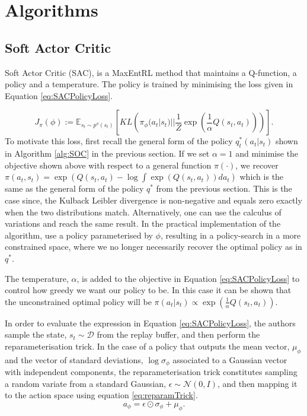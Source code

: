 \documentclass{report}
\numberwithin{equation}{section}
\numberwithin{figure}{section}
\numberwithin{table}{section}
\numberwithin{algorithm}{section}
\begin{document}
\chapter{Algorithms}\label{chap:MaxEntRLAlgos}

\section{Soft Actor Critic}\label{sec:SAC}
Soft Actor Critic (SAC), is a MaxEntRL method that maintains 
a Q-function, a policy and a temperature. The policy 
is trained by minimising the loss given in Equation \ref{eq:SACPolicyLoss}.

\begin{equation}\label{eq:SACPolicyLoss}
  J_\pi(\phi):=\mathbb{E}_{s_t\sim p^\pi(s_t)}\left[KL\left(\pi_\phi(a_t|s_t)||\frac{1}{Z}\exp\left(\frac{1}{\alpha}Q(s_t,a_t)\right)\right)\right].
\end{equation}
To motivate this loss, first recall the general form of the policy 
$q^*_t(a_t|s_t)$ shown in Algorithm \ref{alg:SOC} in the previous
section. If we set $\alpha=1$ and 
minimise the objective shown above with respect to a general function 
$\pi(\cdot)$, we recover $\pi(a_t,s_t)=\exp(Q(s_t,a_t) - \log \int \exp(Q(s_t,a_t))da_t)$ 
which is the same as the general form of the policy $q^*$ from 
the previous section. This is the case since, the Kulback Leibler 
divergence is non-negative and equals zero exactly when the 
two distributions match. Alternatively, one can use the 
calculus of variations and reach the same result. In 
the practical implementation of the algorithm, \cite{SAC2} use 
a policy parameterised by $\phi$, resulting in a policy-search 
in a more constrained space, where we no longer necessarily recover 
the optimal policy as in $q^*$.

The temperature, $\alpha$, is added to the objective in Equation
\ref{eq:SACPolicyLoss} to control how greedy we want our policy 
to be. In this case it can be shown that the unconstrained 
optimal policy 
will be $\pi(a_t|s_t)\propto\exp\left(\frac{1}{\alpha}Q(s_t,a_t)\right)$.

In order to evaluate the expression in Equation \ref{eq:SACPolicyLoss}, 
the authors sample the state, $s_t\sim\mathcal{D}$ from the 
replay buffer, and then perform the reparameterisation trick. 
In the case of a policy that outputs the mean vector, $\mu_\phi$ and 
the vector of standard deviations, $\log\sigma_\phi$ 
associated to a Gaussian vector 
with independent components, the reparameterisation trick constitutes 
sampling a random variate from a standard Gaussian, 
$\epsilon\sim\mathcal{N}(0, I)$, and then mapping it to the action space 
using equation \ref{eq:reparamTrick}.
\begin{equation}\label{eq:reparamTrick}
  a_\phi=\epsilon \odot \sigma_\phi + \mu_\phi.
\end{equation}
\end{document}
